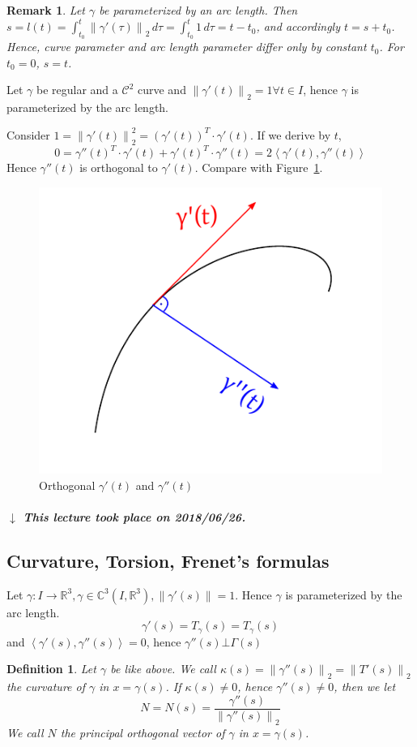 \documentclass{article}
\newtheorem{definition}{Definition}  \numberwithin{definition}{section}
\newtheorem{remark}{Remark}  \numberwithin{remark}{section}
\newcommand{\angel}[1]{\left\langle#1\right\rangle}
\newcommand{\norm}[1]{\left\|#1\right\|}
\newcommand{\dateref}[1]{%
  \begin{mdframed}[backgroundcolor=gray!10,innerbottommargin=0pt,innertopmargin=0pt]
    \paragraph{\textit{$\downarrow$ This lecture took place on #1.}}%
  \end{mdframed}%
}
\begin{document}
\begin{remark}
  Let $\gamma$ be parameterized by an arc length.
  Then $s = l(t) = \int_{t_0}^t \norm{\gamma'(\tau)}_2 \, d\tau = \int_{t_0}^t 1 \, d\tau = t - t_0$, and accordingly $t = s + t_0$.
  Hence, curve parameter and arc length parameter differ only by constant $t_0$. For $t_0 = 0$, $s = t$.
\end{remark}

Let $\gamma$ be regular and a $\mathcal C^2$ curve and $\norm{\gamma'(t)}_2 = 1 \forall t \in I$, hence $\gamma$ is parameterized by the arc length.

Consider $1 = \norm{\gamma'(t)}_2^2 = \left(\gamma'(t)\right)^T \cdot \gamma'(t)$. If we derive by $t$,
\[ 0 = \gamma''(t)^T \cdot \gamma'(t) + \gamma'(t)^T \cdot \gamma''(t) = 2 \angel{\gamma'(t), \gamma''(t)} \]
Hence $\gamma''(t)$ is orthogonal to $\gamma'(t)$. Compare with Figure~\ref{img:orthott}.

\begin{figure}[t]
  \begin{center}
    \includegraphics[width=.5\textwidth]{img/49_orthogonal.pdf}
    \caption{Orthogonal $\gamma'(t)$ and $\gamma''(t)$}
    \label{img:orthott}
  \end{center}
\end{figure}

\dateref{2018/06/26}

\subsection{Curvature, Torsion, Frenet's formulas}

Let $\gamma: I \to \mathbb R^3, \gamma \in \mathbb C^3(I, \mathbb R^3), \norm{\gamma'(s)} = 1$.
Hence $\gamma$ is parameterized by the arc length.
\[ \gamma'(s) = T_\gamma(s) = T_\gamma(s) \]
and $\angel{\gamma'(s), \gamma''(s)} = 0$, hence $\gamma''(s) \bot \Gamma(s)$

\begin{definition} %
  Let $\gamma$ be like above. We call $\kappa(s) = \norm{\gamma''(s)}_2 = \norm{T'(s)}_2$ \emph{the curvature of $\gamma$ in $x = \gamma(s)$}.
  If $\kappa(s) \neq 0$, hence $\gamma''(s) \neq 0$, then we let
  \[ N = N(s) = \frac{\gamma''(s)}{\norm{\gamma''(s)}_2} \]
  We call $N$ the \emph{principal orthogonal vector of $\gamma$ in $x = \gamma(s)$}.
\end{definition}
\end{document}
